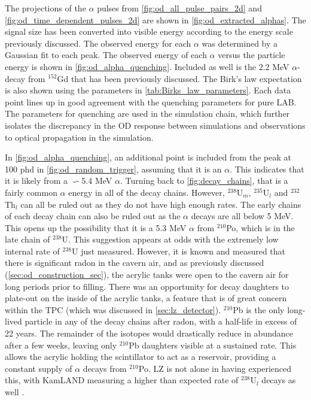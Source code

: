 \par
The projections of the $\alpha$ pulses from \autoref{fig:od_all_pulse_pairs_2d} and \autoref{fig:od_time_dependent_pulses_2d} are shown in \autoref{fig:od_extracted_alphas}.
The signal size has been converted into visible energy according to the energy scale previously discussed.
The observed energy for each $\alpha$ was determined by a Gaussian fit to each peak.
The observed energy of each $\alpha$ versus the particle energy is shown in \autoref{fig:od_alpha_quenching}.
Included as well is the 2.2 MeV $\alpha$-decay from ${}^{152}$Gd that has been previously discussed.
The Birk's law expectation is also shown using the parameters in \autoref{tab:Birks_law_parameters}.
Each data point lines up in good agreement with the quenching parameters for pure LAB.
The parameters for quenching are used in the simulation chain, which further isolates the discrepancy in the OD response between simulations and observations to optical propagation in the simulation.
\par
In \autoref{fig:od_alpha_quenching}, an additional point is included from the peak at 100 phd in \autoref{fig:od_random_trigger}, assuming that it is an $\alpha$.
This indicates that it is likely from a $\backsim$5.4 MeV $\alpha$.
Turning back to \autoref{fig:decay_chains}, that is a fairly common $\alpha$ energy in all of the decay chains.
However, ${}^{238}$U$_{m}$, ${}^{235}$U$_{l}$ and ${}^{232}$Th$_{l}$ can all be ruled out as they do not have high enough rates.
The early chains of each decay chain can also be ruled out as the $\alpha$ decays are all below 5 MeV.
This opens up the possibility that it is a 5.3 MeV $\alpha$ from ${}^{210}$Po, which is in the late chain of ${}^{238}$U.
This suggestion appears at odds with the extremely low internal rate of ${}^{238}$U just measured.
However, it is known and measured that there is significant radon in the cavern air, and as previously discussed (\autoref{sec:od_construction_sec}), the acrylic tanks were open to the cavern air for long periods prior to filling.
There was an opportunity for decay daughters to plate-out on the inside of the acrylic tanks, a feature that is of great concern within the TPC \cite{radon_plateout_ref} (which was discussed in \autoref{sec:lz_detector}).
${}^{210}$Pb is the only long-lived particle in any of the decay chains after radon, with a half-life in excess of 22 years. 
The remainder of the isotopes would drastically reduce in abundance after a few weeks, leaving only ${}^{210}$Pb daughters visible at a sustained rate.
This allows the acrylic holding the scintillator to act as a reservoir, providing a constant supply of $\alpha$ decays from ${}^{210}$Po.
LZ is not alone in having experienced this, with KamLAND measuring a higher than expected rate of ${}^{238}$U$_l$ decays as well \cite{KamLAND_LS_contaminants_ref}.

